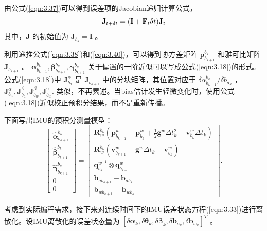 由公式(\ref{eqn:3.37})可以得到误差项的Jacobian递归计算公式， 
\begin{equation}
\label{eqn:3.40}
\setlength{\abovedisplayskip}{6pt}
\setlength{\belowdisplayskip}{6pt}
\mathbf{J}_{t+\delta t}=(\mathbf{I}+\mathbf{F}_t\delta t)\mathbf{J}_t
\end{equation}
其中，$\mathbf{J} $ 的初始值为 $\mathbf{J}_{b_k}=\mathbf{I}  $ 。

利用递推公式(\ref{eqn:3.38})和(\ref{eqn:3.40})，可以得到协方差矩阵 $\mathbf{p}_{b_{k+1}}^{b_k}  $ 和雅可比矩阵 $\mathbf{J}_{b_{k+1}} $ 。 $\bm{\alpha}_{b_{k+1}}^{b_k},\bm{\beta}_{b_{k+1}}^{b_k}, \bm{\gamma}_{b_{k+1}}^{b_k} $ 关于偏置的一阶近似可以写成公式(\ref{eqn:3.18})的形式。公式(\ref{eqn:3.18})中 $ \mathbf{J}_{b_a}^\alpha $ 是 $ \mathbf{J}_{b_{k+1}} $ 中的分块矩阵，其位置对应于 $ {\delta\alpha_{b_{k+1}}^{b_k}}/{\delta b_{a_k}} $ ， $ \mathbf{J}_{b_w}^\alpha,\mathbf{J}_{b_a}^\beta,\mathbf{J}_{b_w}^\beta,\mathbf{J}_{b_w}^\gamma. $ 类似，不再累述。当bias估计发生轻微变化时，使用公式(\ref{eqn:3.18})近似校正预积分结果，而不是重新传播。

下面写出IMU的预积分测量模型：
\begin{equation}
\label{eqn:3.41}
\begin{bmatrix}
\hat{\bm{\alpha}}_{b_{k+1}}^{b_k} \\ \hat{\bm{\beta}}_{b_{k+1}}^{b_k} \\ \hat{\bm{\gamma}}_{b_{k+1}}^{b_k} \\ 0 \\ 0
\end{bmatrix}=
\begin{bmatrix}
\mathbf{R}_w^{b_k}(\mathbf{p}_{b_{k+1}}^w-\mathbf{p}_{b_k}^w+\frac{1}{2}\mathbf{g}^w\Delta t_k^2-\mathbf{v}_{b_k}^w\Delta t_k) \\ \mathbf{R}_w^{b_k}(\mathbf{v}_{b_{k+1}}^w+\mathbf{g}^w\Delta t_k-\mathbf{v}_{b_k}^w) \\ \mathbf{q}_{b_k}^{w^{-1}}\otimes \mathbf{q}_{b_{k+1}}^w \\ \mathbf{b}_{ab_{k+1}}-\mathbf{b}_{ab_k} \\ \mathbf{b}_{wb_{k+1}}-\mathbf{b}_{wb_k}
\end{bmatrix}.
\end{equation}

考虑到实际编程需求，接下来对连续时间下的IMU误差状态方程(\ref{eqn:3.33})进行离散化。设IMU离散化的误差状态量为 $[\delta \bm{\alpha}_{k}, {\delta \bm{\theta}_{k}}, {\delta \bm{\beta}_{k}}, \delta \mathbf{b}_{a_{k}}, \delta \mathbf{b}_{w_{k}}]^T $ 。


